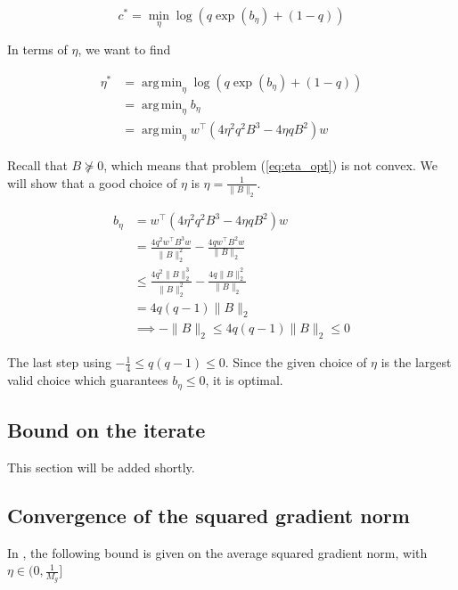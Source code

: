 \documentclass[11pt]{article}
\DeclareMathOperator*{\argmin}{arg\,min}
\begin{document}
\begin{equation}
    c^* = \min_{\eta} \log( q \exp(b_\eta ) + (1 - q))
\end{equation}

In terms of $\eta$, we want to find

\begin{equation}
\label{eq:eta_opt}
\begin{split}
    \eta^* &= \argmin_{\eta} \log( q \exp(b_\eta ) + (1 - q)) \\
    &= \argmin_{\eta} b_\eta \\
    &= \argmin_{\eta} w^{\top} ( 4 \eta^2 q^2 B^3 - 4 \eta q B^2)w
\end{split}
\end{equation}

Recall that $B \nsucceq 0$, which means that problem (\ref{eq:eta_opt}) is not convex. We will show that a good choice of $\eta$ is $\eta = \frac{1}{\|B\|_2}$.

\begin{align*}
    b_\eta &= w^{\top} ( 4 \eta^2 q^2 B^3 - 4 \eta q B^2)w \\
    &= \frac{4 q^2 w^{\top} B^3 w}{\|B\|_2^2} - \frac{4 q w^{\top} B^2 w}{\|B\|_2} \\
    &\leq \frac{4 q^2 \|B\|_2^3}{\|B\|_2^2} - \frac{4 q \|B\|_2^2 }{\|B\|_2} \\
    &= 4 q (q-1) \|B\|_2 \\
    &\implies -\|B\|_2 \leq 4 q (q-1) \|B\|_2 \leq 0
\end{align*}

The last step using $-\frac{1}{4} \leq q (q-1) \leq 0$. Since the given choice of $\eta$ is the largest valid choice which guarantees $b_\eta \leq 0$, it is optimal.

\subsection{Bound on the iterate}

This section will be added shortly.

\subsection{Convergence of the squared gradient norm}

In \cite{khamaru_convergence_2018}, the following bound is given on the average squared gradient norm, with $\eta \in (0, \frac{1}{M_g}]$
\end{document}
